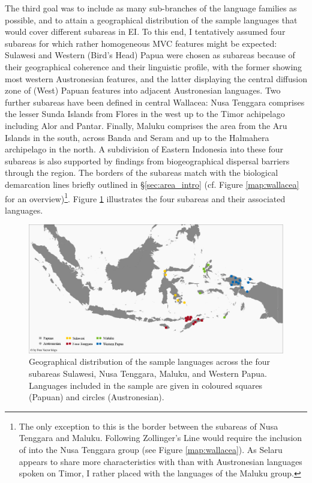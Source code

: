 The third goal was to include as many sub-branches of the language families as possible, and to attain a geographical distribution of the sample languages that would cover different subareas in EI. To this end, I tentatively assumed four subareas for which rather homogeneous MVC features might be expected: Sulawesi and Western (Bird's Head) Papua were chosen as subareas because of their geographical coherence and their linguistic profile, with the former showing most western Austronesian features, and the latter displaying the central diffusion zone of (West) Papuan features into adjacent Austronesian languages. Two further subareas have been defined in central Wallacea: Nusa Tenggara comprises the lesser Sunda Islands from Flores in the west up to the Timor achipelago including Alor and Pantar. Finally, Maluku comprises the area from the Aru Islands in the south, across Banda and Seram and up to the Halmahera archipelago in the north. A subdivision of Eastern Indonesia into these four subareas is also supported by findings from biogeographical dispersal barriers through the region. The borders of the subareas match with the biological demarcation lines briefly outlined in §\ref{sec:area_intro} (cf. Figure \ref{map:wallacea} for an overview)\footnote{The only exception to this is the border between the subareas of Nusa Tenggara and Maluku. Following Zollinger's Line would require the inclusion of  into the Nusa Tenggara group (see Figure \ref{map:wallacea}). As Selaru appears to share more characteristics with  than with Austronesian languages spoken on Timor, I rather placed  with the languages of the Maluku group.}. Figure \ref{map:subareas} illustrates the four subareas and their associated languages. %

\begin{figure}
\includegraphics[width=\columnwidth]{figures/Map_overview_klein_subareas.eps}
\caption[Geographical distribution of the sample languages across subareas]{Geographical distribution of the sample languages across the four subareas Sulawesi, Nusa Tenggara, Maluku, and Western Papua. Languages included in the sample are given in coloured squares (Papuan) and circles (Austronesian).}\label{map:subareas}
\end{figure}


